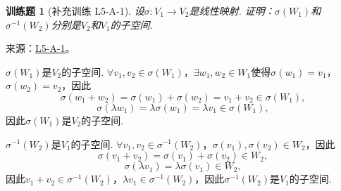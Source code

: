 \documentclass[UTF8,12pt,a4paper,fontset=fandol]{ctexart}
\newtheorem{exercise}{训练题}[section]
\begin{document}
\begin{exercise}[补充训练 L5-A-1]\label{prob:L5-A-1}
设$\sigma: V_1\to V_2$是线性映射. 证明：$\sigma(W_1)$和$\sigma^{-1}(W_2)$分别是$V_2$和$V_1$的子空间.
\end{exercise}
\noindent 来源：\href{https://github.com/yhwu-is/Linear-Algebra-Left-Undone/blob/new/%E8%AE%B2%E4%B9%89/%E4%B8%93%E9%A2%98/5%20%E7%BA%BF%E6%80%A7%E6%98%A0%E5%B0%84.tex}{L5-A-1}。
\begin{solve}
$\sigma(W_1)$是$V_2$的子空间. $\forall v_1,v_2\in\sigma(W_1)$，$\exists w_1,w_2\in W_1$使得$\sigma(w_1)=v_1$，$\sigma(w_2)=v_2$，因此
            \[\sigma(w_1+w_2)=\sigma(w_1)+\sigma(w_2)=v_1+v_2\in\sigma(W_1),\]
            \[\sigma(\lambda w_1)=\lambda\sigma(w_1)=\lambda v_1\in\sigma(W_1),\]
            因此$\sigma(W_1)$是$V_2$的子空间.

            $\sigma^{-1}(W_2)$是$V_1$的子空间. $\forall v_1,v_2\in\sigma^{-1}(W_2)$，$\sigma(v_1),\sigma(v_2)\in W_2$，因此
            \[\sigma(v_1+v_2)=\sigma(v_1)+\sigma(v_2)\in W_2,\]
            \[\sigma(\lambda v_1)=\lambda\sigma(v_1)\in W_2,\]
            因此$v_1+v_2\in\sigma^{-1}(W_2)$，$\lambda v_1\in\sigma^{-1}(W_2)$，因此$\sigma^{-1}(W_2)$是$V_1$的子空间.
\end{solve}
\end{document}

